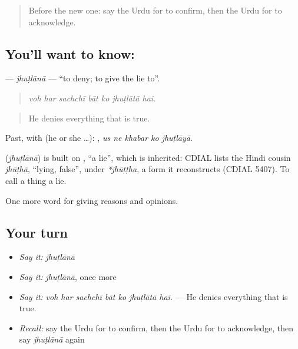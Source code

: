 \label{lesson:UR-C337-jhutlana}



\begin{quote}
Before the new one: say the Urdu for to confirm, then the Urdu for to acknowledge.
\end{quote}

\subsection*{You'll want to know: }
\textbf{} — \emph{jhuṭlānā} — \textquotedblleft{}to deny; to give the lie to\textquotedblright{}.

\begin{quote}
      
\end{quote}

\begin{quote}
\emph{voh har sachchī bāt ko jhuṭlātā hai.}
\end{quote}

\begin{quote}
He denies everything that is true.
\end{quote}

Past, with  (he or she …):     , \emph{us ne khabar ko jhuṭlāyā}.

\begin{cousinweb}
\textbf{} (\emph{jhuṭlānā}) is built on \textbf{}, \textquotedblleft{}a lie\textquotedblright{}, which is inherited: CDIAL lists the Hindi cousin \emph{jhūṭhā}, \textquotedblleft{}lying, false\textquotedblright{}, under \emph{*jhūṭṭha}, a form it reconstructs (CDIAL 5407). To call a thing a lie.
\end{cousinweb}

\begin{grammarlens}[title={What you've built}]
One more word for giving reasons and opinions.
\end{grammarlens}

\subsection*{Your turn}
\begin{itemize}
\raggedright
  \item \emph{Say it:} \emph{jhuṭlānā}
  \item \emph{Say it:} \emph{jhuṭlānā}, once more
  \item \emph{Say it:} \emph{voh har sachchī bāt ko jhuṭlātā hai.} — He denies everything that is true.
  \item \emph{Recall:} say the Urdu for to confirm, then the Urdu for to acknowledge, then say \emph{jhuṭlānā} again
\end{itemize}

